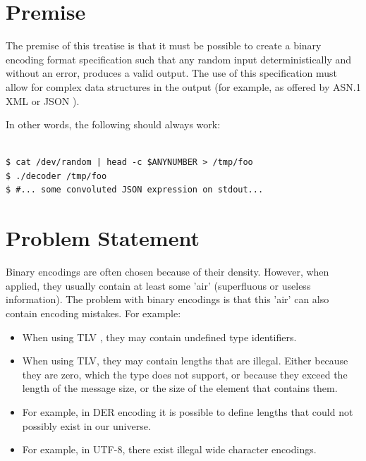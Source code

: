 \section{Premise}

The premise of this treatise is that it must be possible to create
a binary encoding format specification such that any random input 
deterministically and without an error, produces a valid output.
The use of this specification must allow for complex data structures
in the output (for example, as offered by ASN.1 \cite{bib:asn1}
  XML \cite{bib:xml} or JSON \cite{bib:json}).

In other words, the following should always work:

\begin{changemargin}{-60mm}{0mm}
\begin{myquote}
\begin{verbatim}

$ cat /dev/random | head -c $ANYNUMBER > /tmp/foo
$ ./decoder /tmp/foo
$ #... some convoluted JSON expression on stdout...

\end{verbatim}
\end{myquote}
\end{changemargin}

\section{Problem Statement}

Binary encodings are often chosen because of their density.
However, when applied, they usually contain at least some 'air'
(superfluous or useless information).
The problem with binary encodings is that this 'air' can also contain
encoding mistakes. For example:

\begin{itemize}
\item When using TLV \cite{bib:tlv}, they may contain undefined type identifiers.
\item When using TLV, they may contain lengths that are illegal.
  Either because they are zero, which the type does not support,
  or because they exceed the length of the message size, or
  the size of the element that contains them.
\item For example, in DER \cite{bib:ber} encoding it is possible to define lengths
  that could not possibly exist in our universe.
\item For example, in UTF-8, there exist illegal wide character encodings.
\end{itemize}


